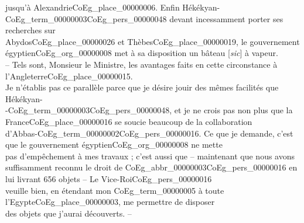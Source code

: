 \documentclass{book}
\begin{document}
jusqu’à Alexandrie\gls{CoEg_place_00000006}. Enfin Hékékyan-\gls{CoEg_term_00000003}\gls{CoEg_pers_00000048} devant incessamment porter ses recherches sur\\
Abydos\gls{CoEg_place_00000026} et Thèbes\gls{CoEg_place_00000019}, le gouvernement égyptien\gls{CoEg_org_00000008} met à sa disposition un bâteau {[\textit{sic}]} à vapeur.\\
– Tels sont, Monsieur le Ministre, les avantages faits en cette circonstance à l’Angleterre\gls{CoEg_place_00000015}.\\
Je n’établis pas ce parallèle parce que je désire jouir des mêmes facilités que Hékékyan-\\
-\gls{CoEg_term_00000003}\gls{CoEg_pers_00000048}, et je ne crois pas non plus que la France\gls{CoEg_place_00000016} se soucie beaucoup de la collaboration\\
d’Abbas-\Gls{CoEg_term_00000002}\gls{CoEg_pers_00000016}. Ce que je demande, c’est que le gouvernement égyptien\gls{CoEg_org_00000008} ne mette\\
pas d’empêchement à mes travaux ; c’est aussi que – maintenant que nous avons\\
suffisamment reconnu le droit de \gls{CoEg_abbr_00000003}\gls{CoEg_pers_00000016} en lui livrant 656 objets – Le Vice-Roi\gls{CoEg_pers_00000016}\\
veuille bien, en étendant mon \gls{CoEg_term_00000005} à toute l’Egypte\gls{CoEg_place_00000003}, me permettre de disposer\\
des objets que j’aurai découverts. –
\end{document}
